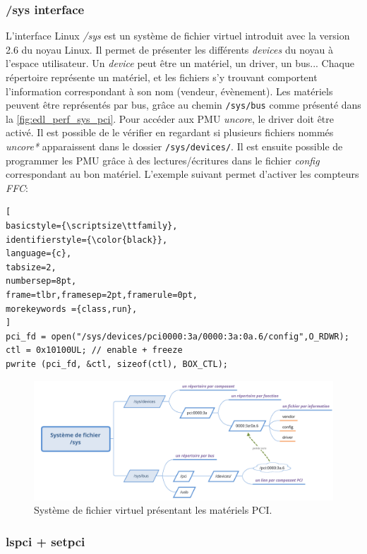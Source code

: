     \subsubsection{/sys interface}
        L'interface Linux \textit{/sys} est un système de fichier virtuel introduit avec la version 2.6 du noyau Linux. Il permet de présenter les différents \textit{devices} du noyau à l'espace utilisateur. Un \textit{device} peut être un matériel, un driver, un bus... Chaque répertoire représente un matériel, et les fichiers s'y trouvant comportent l'information correspondant à son nom (vendeur, évènement). Les matériels peuvent être représentés par bus, grâce au chemin \verb|/sys/bus| comme présenté dans la \autoref{fig:edl_perf_sys_pci}. Pour accéder aux PMU \textit{uncore}, le driver doit être activé. Il est possible de le vérifier en regardant si plusieurs fichiers nommés \textit{uncore*} apparaissent dans le dossier \verb|/sys/devices/|. Il est ensuite possible de programmer les PMU grâce à des lectures/écritures dans le fichier \textit{config} correspondant au bon matériel. L'exemple suivant permet d'activer les compteurs \textit{FFC}:
   
    
\begin{lstlisting}[
basicstyle={\scriptsize\ttfamily},
identifierstyle={\color{black}},
language={c},
tabsize=2,
numbersep=8pt,
frame=tlbr,framesep=2pt,framerule=0pt,
morekeywords ={class,run},
]
pci_fd = open("/sys/devices/pci0000:3a/0000:3a:0a.6/config",O_RDWR);
ctl = 0x10100UL; // enable + freeze
pwrite (pci_fd, &ctl, sizeof(ctl), BOX_CTL);
\end{lstlisting}

    
    \begin{figure}
    \center
    \includegraphics[width=14cm]{images/edl_perf_sys_pci.png}
    \caption{\label{fig:edl_perf_sys_pci} Système de fichier virtuel présentant les matériels PCI.}
    \end{figure}

    
    \subsubsection{lspci + setpci}
    
